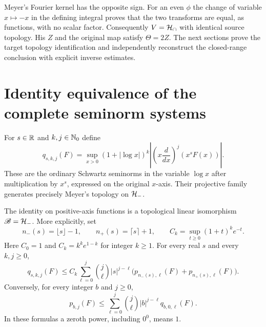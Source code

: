 \documentclass[11pt]{article}
\begin{document}
Meyer's Fourier kernel has the opposite sign. For an even $\phi$ the
change of variable $x\mapsto-x$ in the defining integral proves that
the two transforms are equal, as functions, with no scalar factor.
Consequently $V=\mathcal H_\cap$ with identical source topology. His $Z$ and
the original map satisfy $\Theta=2Z$. The next sections prove the target
topology identification and independently reconstruct the closed-range
conclusion with explicit inverse estimates.

\section{Identity equivalence of the complete seminorm systems}

For $s\in\mathbb R$ and $k,j\in\mathbb N_0$ define
\begin{equation}\label{ltheta:eq:q}
 q_{s,k,j}(F)=\sup_{x>0}(1+|\log x|)^k
 \left|\left(x\frac d{dx}\right)^j(x^sF(x))\right|.
\end{equation}
These are the ordinary Schwartz seminorms in the variable $\log x$
after multiplication by $x^s$, expressed on the original $x$-axis. Their
projective family generates precisely Meyer's topology on $\mathcal H_-$.

\begin{lthetatheorem}\label{ltheta:thm:topology}
The identity on positive-axis functions is a topological linear
isomorphism $\mathscr B=\mathcal H_-$. More explicitly, set
\[
 n_-(s)=\lfloor s\rfloor-1,\qquad n_+(s)=\lceil s\rceil+1,
 \qquad C_k=\sup_{t\geq0}(1+t)^ke^{-t}.
\]
Here $C_0=1$ and $C_k=k^ke^{1-k}$ for integer $k\geq1$.
For every real $s$ and every $k,j\geq0$,
\begin{equation}\label{ltheta:eq:q-from-p}
 q_{s,k,j}(F)\leq C_k\sum_{\ell=0}^j\binom j\ell
 |s|^{j-\ell}\bigl(p_{n_-(s),\ell}(F)+p_{n_+(s),\ell}(F)\bigr).
\end{equation}
Conversely, for every integer $b$ and $j\geq0$,
\begin{equation}\label{ltheta:eq:p-from-q}
 p_{b,j}(F)\leq\sum_{\ell=0}^j\binom j\ell
 |b|^{j-\ell}q_{b,0,\ell}(F).
\end{equation}
In these formulas a zeroth power, including $0^0$, means $1$.
\end{lthetatheorem}
\end{document}
